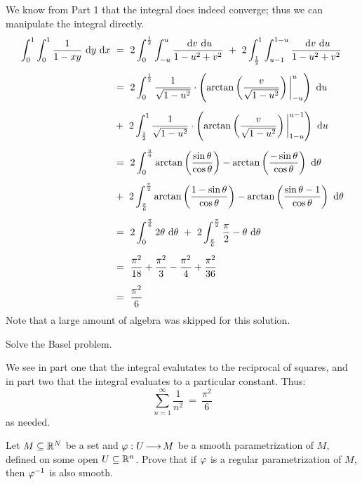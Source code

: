 \begin{soln}
    We know from Part 1 that the integral does indeed converge; thus we can
    manipulate the integral directly.
    \begin{align*}
        \int_{0}^{1}\int_{0}^{1}\frac{1}{1-xy}\di y\di x & \ = \
        2\int_{0}^{\frac{1}{2}}\int_{-u}^{u}\frac{\di v\di u}{1-u^{2}+v^{2}}
        \ + \ 2\int_{\frac{1}{2}}^{1}\int_{u-1}^{1-u}\frac{\di v\di u}
        {1-u^{2}+v^{2}} \vsp
        & \ = \ 2\int_{0}^{\frac{1}{2}}\frac{1}{\sqrt{1-u^{2}}}\cdot
        \left( \arctan \left( \frac{v}{\sqrt{1-u^{2}}} \right)\bigg\rvert_{-u}^u
        \right)\di u \vsp
        & \ + \ 2\int_{\frac{1}{2}}^{1}\frac{1}{\sqrt{1-u^{2}}}\cdot\left(
        \arctan \left( \frac{v}{\sqrt{1-u^{2}}} \right)\bigg\rvert_{1-u}^{u-1}
        \right)\di u \vsp
        & \ = \ 2\int_{0}^{\frac{\pi}{6}}\arctan\left(\frac{\sin\theta}
        {\cos\theta}\right)-\arctan\left(\frac{-\sin\theta}{\cos\theta}\right)
        \di\theta \vsp
        & \ + \ 2\int_{\frac{\pi}{6}}^{\frac{\pi}{2}}\arctan\left(\frac{1-\sin
        \theta}{\cos\theta}\right)-\arctan\left(\frac{\sin\theta-1}{\cos\theta}
        \right)\di\theta \vsp
        & \ = \ 2\int_{0}^{\frac{\pi}{6}}2\theta\di\theta \ + \
        2\int_{\frac{\pi}{6}}^{\frac{\pi}{2}}\frac{\pi}{2}-\theta\di\theta \vsp
        & \ = \ \frac{\pi^{2}}{18}+\frac{\pi^{2}}{3}-\frac{\pi^{2}}{4}
        +\frac{\pi^{2}}{36} \vsp
        & \ = \ \frac{\pi^{2}}{6}
    \end{align*}
    Note that a large amount of algebra was skipped for this solution.
\end{soln}

\begin{qu}[title=Basel Problem,num=38.3]
    Solve the Basel problem.
\end{qu}

\begin{soln}
    We see in part one that the integral evalutates to the reciprocal of squares,
    and in part two that the integral evaluates to a particular constant. Thus:
    \begin{equation*}
        \sum_{n=1}^{\infty}\frac{1}{n^{2}} \ = \ \frac{\pi^{2}}{6}
    \end{equation*}
    as needed.
\end{soln}


\newpage
\label{q39}
\begin{qu}[num=39.1]
    Let $ M \subseteq \mathbb{R}^{N} $ be a set and $ \operatorname{\varphi}:U \operatorname{\longrightarrow} M $ be a smooth
    parametrization of $ M $, defined on some open $ U \subseteq \mathbb{R}^{n} $.
    Prove that if $ \operatorname{\varphi} $ is a regular parametrization of $ M $, then
    $ \operatorname{\varphi}^{-1} $ is also smooth.
\end{qu}

